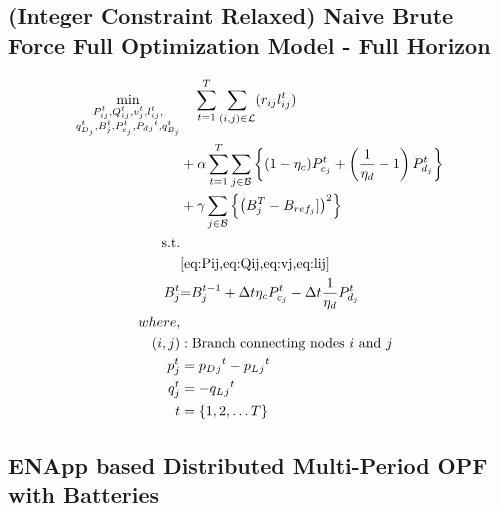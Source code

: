 \documentclass{article}
\begin{document}
\subsection*{(Integer Constraint Relaxed) Naive Brute Force Full Optimization Model - Full Horizon}

\begin{align}
    \min_{
    \substack{
    P_{ij}^t, Q_{ij}^t, v_{j}^t, l_{ij}^t, \\
    q_{D_j}^t, B_{j}^{t}, P_{c_j}^t, P_d{_j}^t, q_{B_j}^t}
    } 
    \vspace{-15ex} %
    & \quad
    \sum_{t = 1}^{T} \sum_{(i, j) \in \mathcal{L}} (r_{ij}l_{ij}^t)  \nonumber\\
    &+ \alpha \sum_{t = 1}^{T} \sum_{j \in \mathcal{B}} \left\{ (1- \eta_c)P_{c_j}^t + \left(\frac{1}{\eta_d}-1\right) P_{d_j}^t \right\} \nonumber\\
    &+ \gamma \sum_{j \in \mathcal{B}} \left\{ \left(B^{T}_{j} - B_{ref_{j}}]\right)^2\right\} \\
    \text{s.t.} & {}\nonumber \\
    {} & {\cref{eq:Pij,eq:Qij,eq:vj,eq:lij}} \\
    {\color{darkgreen}{ B_{j}^{t} }} &\color{darkgreen}{=} { \color{darkgreen}{ B_{j}^{t-1} + \Delta t  \eta_c P_{c_j}^t - \Delta t\frac{1}{\eta_d} P_{d_j}^t } } \\
    {where,} & {} \\
    {(i, j)} &: {\text{Branch connecting nodes $i$ and $j$}} \\
    {p_j^t} &= {p_D{_j}^t - p_L{_j}^t} \\
    {q_j^t} &= {-q_L{_j}^t} \\
    {t} &= {\{1, 2, \ldots T\}}
\end{align}

\subsection{ENApp based Distributed Multi-Period OPF with Batteries}
\end{document}

